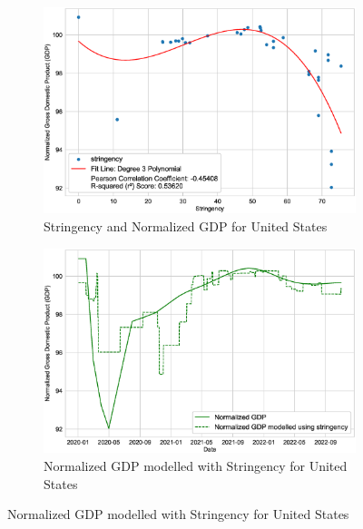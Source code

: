\documentclass[tikz,fleqn,12pt]{wlscirep}
\begin{document}
\begin{figure}[H]
  \centering
  \caption{Stringency and GDP for Advanced Economies}
  \begin{subfigure}[t]{0.48\textwidth}
    \centering
    \includegraphics[width=\linewidth]{images/stringency_vs_gdp_USA.eps}
    \caption{Stringency and Normalized GDP for United States}
  \end{subfigure}
  \label{fig:stringency_vs_gdp_USA}
  \hfill
  \begin{subfigure}[t]{0.48\textwidth}
    \centering
    \includegraphics[width=\linewidth]{images/gdp_modelled_with_stringency_USA.eps}
    \caption{Normalized GDP modelled with Stringency for United States}
  \end{subfigure}
  \label{fig:gdp_modelled_with_stringency_USA}


\end{figure}
\end{document}

